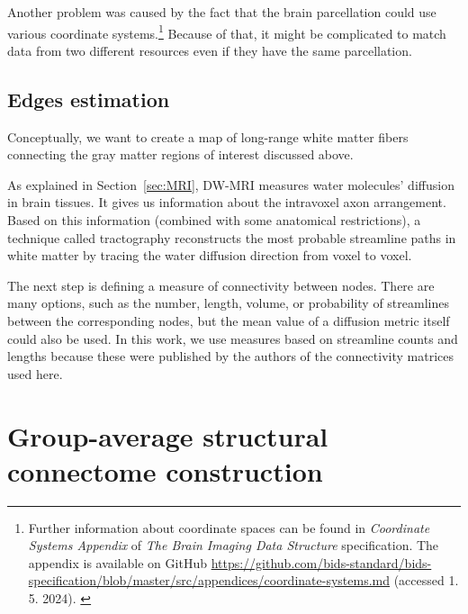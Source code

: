 Another problem was caused by the fact that the brain parcellation could use various coordinate systems.\footnote{Further information about coordinate spaces can be found in \textit{Coordinate Systems Appendix} of \textit{The Brain Imaging Data Structure} specification. The appendix is available on GitHub \url{https://github.com/bids-standard/bids-specification/blob/master/src/appendices/coordinate-systems.md} (accessed 1. 5. 2024). \cite{gorgolewski_brain_2016}} Because of that, it might be complicated to match data from two different resources even if they have the same parcellation.


\subsection{Edges estimation}

Conceptually, we want to create a map of long-range white matter fibers connecting the gray matter regions of interest discussed above. 

As explained in Section~\ref{sec:MRI}, DW-MRI measures water molecules' diffusion in brain tissues. It gives us information about the intravoxel axon arrangement. Based on this information (combined with some anatomical restrictions), a technique called tractography reconstructs the most probable streamline paths in white matter by tracing the water diffusion direction from voxel to voxel. \cite{yeh_mapping_2021,iturria-medina_characterizing_2007} 

The next step is defining a measure of connectivity between nodes. There are many options, such as the number, length, volume, or probability of streamlines between the corresponding nodes, but the mean value of a diffusion metric itself could also be used. \cite{yeh_mapping_2021} In this work, we use measures based on streamline counts and lengths because these were published by the authors of the connectivity matrices used here.


\section{Group-average structural connectome construction}\label{sec:group-avg}

